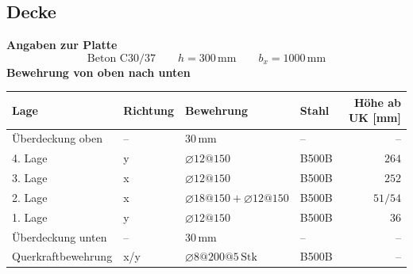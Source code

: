 \documentclass[11pt,a4paper]{article}
\begin{document}
\subsection{Decke}
\noindent\textbf{Angaben zur Platte}
\begin{equation*}
\text{Beton C30/37} \qquad h = 300\,\mathrm{mm} \qquad b_x = 1000\,\mathrm{mm}
\end{equation*}
\noindent\textbf{Bewehrung von oben nach unten}
\begin{longtable}{llllr}
\hline
Lage & Richtung & Bewehrung & Stahl & Höhe ab UK [mm] \\
\hline
\endhead
Überdeckung oben & – & $30\,\mathrm{mm}$ & – & – \\
4. Lage & y & $\varnothing 12@150$ & B500B & $264$ \\
3. Lage & x & $\varnothing 12@150$ & B500B & $252$ \\
2. Lage & x & $\varnothing 18@150 + \varnothing 12@150$ & B500B & $51 / 54$ \\
1. Lage & y & $\varnothing 12@150$ & B500B & $36$ \\
Überdeckung unten & – & $30\,\mathrm{mm}$ & – & – \\
Querkraftbewehrung & x/y & $\varnothing 8@200@5\,\text{Stk}$ & B500B & – \\
\hline
\end{longtable}
\end{document}
